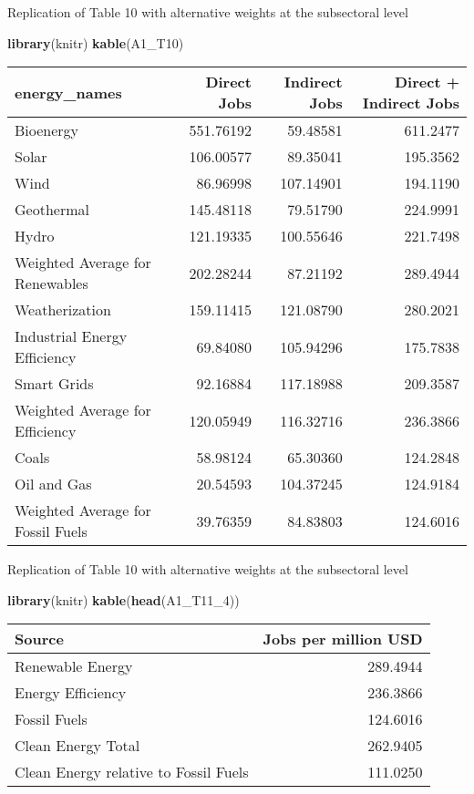 \documentclass[
]{article}
\newenvironment{Shaded}{\begin{snugshade}}{\end{snugshade}}
\newcommand{\DecValTok}[1]{\textcolor[rgb]{0.00,0.00,0.81}{#1}}
\newcommand{\KeywordTok}[1]{\textcolor[rgb]{0.13,0.29,0.53}{\textbf{#1}}}
\newcommand{\NormalTok}[1]{#1}
\begin{document}
Replication of Table 10 with alternative weights at the subsectoral
level

\begin{Shaded}
\begin{Highlighting}[]
\KeywordTok{library}\NormalTok{(knitr)}
\KeywordTok{kable}\NormalTok{(A1_T10)}
\end{Highlighting}
\end{Shaded}

\begin{longtable}[]{@{}lrrr@{}}
\toprule
energy\_names & Direct Jobs & Indirect Jobs & Direct + Indirect
Jobs\tabularnewline
\midrule
\endhead
Bioenergy & 551.76192 & 59.48581 & 611.2477\tabularnewline
Solar & 106.00577 & 89.35041 & 195.3562\tabularnewline
Wind & 86.96998 & 107.14901 & 194.1190\tabularnewline
Geothermal & 145.48118 & 79.51790 & 224.9991\tabularnewline
Hydro & 121.19335 & 100.55646 & 221.7498\tabularnewline
Weighted Average for Renewables & 202.28244 & 87.21192 &
289.4944\tabularnewline
Weatherization & 159.11415 & 121.08790 & 280.2021\tabularnewline
Industrial Energy Efficiency & 69.84080 & 105.94296 &
175.7838\tabularnewline
Smart Grids & 92.16884 & 117.18988 & 209.3587\tabularnewline
Weighted Average for Efficiency & 120.05949 & 116.32716 &
236.3866\tabularnewline
Coals & 58.98124 & 65.30360 & 124.2848\tabularnewline
Oil and Gas & 20.54593 & 104.37245 & 124.9184\tabularnewline
Weighted Average for Fossil Fuels & 39.76359 & 84.83803 &
124.6016\tabularnewline
\bottomrule
\end{longtable}

Replication of Table 10 with alternative weights at the subsectoral
level

\begin{Shaded}
\begin{Highlighting}[]
\KeywordTok{library}\NormalTok{(knitr)}
\KeywordTok{kable}\NormalTok{(}\KeywordTok{head}\NormalTok{(A1_T11_}\DecValTok{4}\NormalTok{))}
\end{Highlighting}
\end{Shaded}

\begin{longtable}[]{@{}lr@{}}
\toprule
Source & Jobs per million USD\tabularnewline
\midrule
\endhead
Renewable Energy & 289.4944\tabularnewline
Energy Efficiency & 236.3866\tabularnewline
Fossil Fuels & 124.6016\tabularnewline
Clean Energy Total & 262.9405\tabularnewline
Clean Energy relative to Fossil Fuels & 111.0250\tabularnewline
\bottomrule
\end{longtable}
\end{document}
